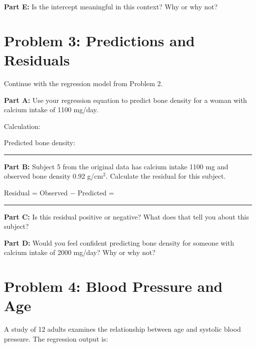 \documentclass[11pt]{article}
\begin{document}
\textbf{Part E:} Is the intercept meaningful in this context? Why or why not?

\vspace{2.5cm}

\newpage

\section{Problem 3: Predictions and Residuals}

Continue with the regression model from Problem 2.

\vspace{0.3cm}

\textbf{Part A:} Use your regression equation to predict bone density for a woman with calcium intake of 1100 mg/day.

\vspace{0.3cm}

Calculation:

\vspace{3cm}

Predicted bone density: \rule{4cm}{0.4pt}

\vspace{1cm}

\textbf{Part B:} Subject 5 from the original data has calcium intake 1100 mg and observed bone density 0.92 g/cm$^2$. Calculate the residual for this subject.

\vspace{0.3cm}

Residual = Observed $-$ Predicted = \rule{6cm}{0.4pt}

\vspace{3cm}

\textbf{Part C:} Is this residual positive or negative? What does that tell you about this subject?

\vspace{3cm}

\textbf{Part D:} Would you feel confident predicting bone density for someone with calcium intake of 2000 mg/day? Why or why not?

\vspace{3cm}

\newpage

\section{Problem 4: Blood Pressure and Age}

A study of 12 adults examines the relationship between age and systolic blood pressure. The regression output is:
\end{document}
